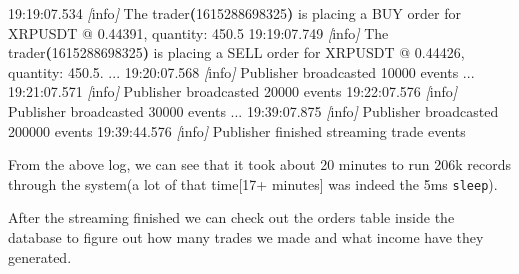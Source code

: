 \documentclass[
  oneside]{book}
\newenvironment{Shaded}{\begin{snugshade}}{\end{snugshade}}
\newcommand{\AttributeTok}[1]{\textcolor[rgb]{0.13,0.29,0.53}{#1}}
\newcommand{\ErrorTok}[1]{\textcolor[rgb]{0.64,0.00,0.00}{\textbf{#1}}}
\newcommand{\ExtensionTok}[1]{#1}
\newcommand{\KeywordTok}[1]{\textcolor[rgb]{0.13,0.29,0.53}{\textbf{#1}}}
\newcommand{\NormalTok}[1]{#1}
\newcommand{\OperatorTok}[1]{\textcolor[rgb]{0.81,0.36,0.00}{\textbf{#1}}}
\newcommand{\PreprocessorTok}[1]{\textcolor[rgb]{0.56,0.35,0.01}{\textit{#1}}}
\newcommand{\SpecialStringTok}[1]{\textcolor[rgb]{0.31,0.60,0.02}{#1}}
\newcommand{\StringTok}[1]{\textcolor[rgb]{0.31,0.60,0.02}{#1}}
\newcommand{\VariableTok}[1]{\textcolor[rgb]{0.00,0.00,0.00}{#1}}
\begin{document}
\begin{Shaded}
\begin{Highlighting}[]
\ExtensionTok{19:19:07.534} \PreprocessorTok{[}\SpecialStringTok{info}\PreprocessorTok{]}\NormalTok{  The trader}\ErrorTok{(}\ExtensionTok{1615288698325}\KeywordTok{)} \ExtensionTok{is}\NormalTok{ placing a BUY order for}
\ExtensionTok{XRPUSDT}\NormalTok{ @ 0.44391, quantity: 450.5}
\ExtensionTok{19:19:07.749} \PreprocessorTok{[}\SpecialStringTok{info}\PreprocessorTok{]}\NormalTok{  The trader}\ErrorTok{(}\ExtensionTok{1615288698325}\KeywordTok{)} \ExtensionTok{is}\NormalTok{ placing a SELL order for}
\ExtensionTok{XRPUSDT}\NormalTok{ @ 0.44426, quantity: 450.5.}
\ExtensionTok{...}
\ExtensionTok{19:20:07.568} \PreprocessorTok{[}\SpecialStringTok{info}\PreprocessorTok{]}\NormalTok{  Publisher broadcasted 10000 events}
\ExtensionTok{...}
\ExtensionTok{19:21:07.571} \PreprocessorTok{[}\SpecialStringTok{info}\PreprocessorTok{]}\NormalTok{  Publisher broadcasted 20000 events}
\ExtensionTok{19:22:07.576} \PreprocessorTok{[}\SpecialStringTok{info}\PreprocessorTok{]}\NormalTok{  Publisher broadcasted 30000 events}
\ExtensionTok{...}
\ExtensionTok{19:39:07.875} \PreprocessorTok{[}\SpecialStringTok{info}\PreprocessorTok{]}\NormalTok{  Publisher broadcasted 200000 events}
\ExtensionTok{19:39:44.576} \PreprocessorTok{[}\SpecialStringTok{info}\PreprocessorTok{]}\NormalTok{  Publisher finished streaming trade events}
\end{Highlighting}
\end{Shaded}

From the above log, we can see that it took about 20 minutes to run 206k records through the system(a lot of that time{[}17+ minutes{]} was indeed the 5ms \texttt{sleep}).

\newpage

After the streaming finished we can check out the orders table inside the database to figure out how many trades we made and what income have they generated.

\begin{Shaded}
\end{Shaded}
\end{document}
